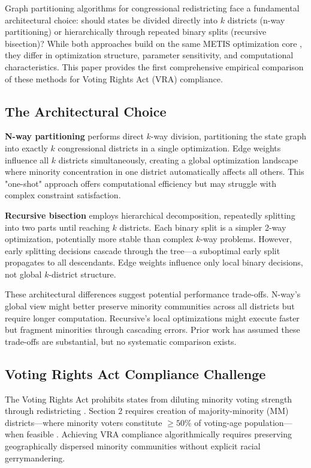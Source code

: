 Graph partitioning algorithms for congressional redistricting face a fundamental architectural choice: should states be divided directly into $k$ districts (n-way partitioning) or hierarchically through repeated binary splits (recursive bisection)? While both approaches build on the same METIS optimization core \citep{karypis1998}, they differ in optimization structure, parameter sensitivity, and computational characteristics. This paper provides the first comprehensive empirical comparison of these methods for Voting Rights Act (VRA) compliance.

\subsection{The Architectural Choice}

\textbf{N-way partitioning} performs direct $k$-way division, partitioning the state graph into exactly $k$ congressional districts in a single optimization. Edge weights influence all $k$ districts simultaneously, creating a global optimization landscape where minority concentration in one district automatically affects all others. This "one-shot" approach offers computational efficiency but may struggle with complex constraint satisfaction.

\textbf{Recursive bisection} employs hierarchical decomposition, repeatedly splitting into two parts until reaching $k$ districts. Each binary split is a simpler 2-way optimization, potentially more stable than complex $k$-way problems. However, early splitting decisions cascade through the tree—a suboptimal early split propagates to all descendants. Edge weights influence only local binary decisions, not global $k$-district structure.

These architectural differences suggest potential performance trade-offs. N-way's global view might better preserve minority communities across all districts but require longer computation. Recursive's local optimizations might execute faster but fragment minorities through cascading errors. Prior work has assumed these trade-offs are substantial, but no systematic comparison exists.

\subsection{Voting Rights Act Compliance Challenge}

The Voting Rights Act prohibits states from diluting minority voting strength through redistricting \citep{thornburg1986}. Section 2 requires creation of majority-minority (MM) districts—where minority voters constitute $\geq 50\%$ of voting-age population—when feasible \citep{johnson2001}. Achieving VRA compliance algorithmically requires preserving geographically dispersed minority communities without explicit racial gerrymandering.

